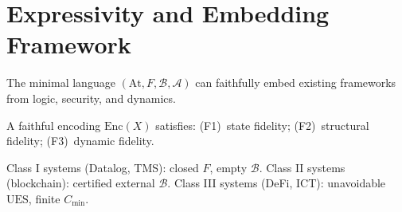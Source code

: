 \section{Expressivity and Embedding Framework}
\label{sec:expressivity}

The minimal language $(\mathrm{At},F,\mathcal{B},\mathcal{A})$ can faithfully embed
existing frameworks from logic, security, and dynamics.

\begin{definition}
A faithful encoding $\mathrm{Enc}(X)$ satisfies:
(F1)~state fidelity; (F2)~structural fidelity; (F3)~dynamic fidelity.
\end{definition}

\begin{proposition}
Class I systems (Datalog, TMS): closed $F$, empty $\mathcal{B}$.
Class II systems (blockchain): certified external $\mathcal{B}$.
Class III systems (DeFi, ICT): unavoidable $\mathrm{UES}$, finite $C_{\min}$.
\end{proposition}

